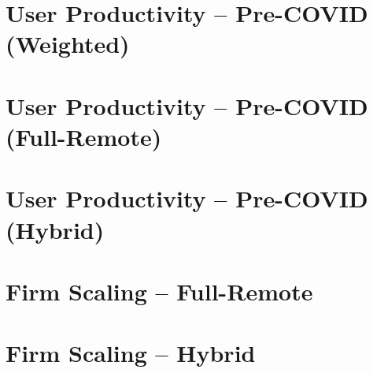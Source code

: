 \documentclass{article}
\begin{document}
\section*{User Productivity – Pre-COVID (Weighted)}



\section*{User Productivity – Pre-COVID (Full-Remote)}



\section*{User Productivity – Pre-COVID (Hybrid)}



\section*{Firm Scaling – Full-Remote}



\section*{Firm Scaling – Hybrid}


\end{document}
